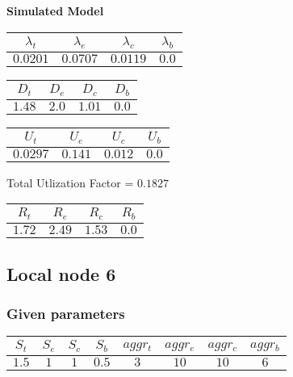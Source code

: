 \documentclass{article}
\begin{document}
\begin{minipage}{0.5\textwidth}
\centering	\textbf{Simulated Model}
\begin{table}[H]
\centering
\begin{tabular}{@{}cccc@{}}
\toprule
$\lambda_t$ & $\lambda_e$ & $\lambda_c$ & $\lambda_b$\\
\midrule
$0.0201$ & $0.0707$ & $0.0119$ & $0.0$\\
\bottomrule
\end{tabular}
\end{table}
\begin{table}[H]
\centering
\begin{tabular}{@{}cccc@{}}
\toprule
$D_t$ & $D_e$ & $D_c$ & $D_b$\\
\midrule
$1.48$ & $2.0$ & $1.01$ & $0.0$\\
\bottomrule
\end{tabular}
\end{table}\begin{table}[H]
\centering
\begin{tabular}{@{}cccc@{}}
\toprule
$U_t$ & $U_e$ & $U_c$ & $U_b$\\
\midrule
$0.0297$ & $0.141$ & $0.012$ & $0.0$\\
\bottomrule
\end{tabular}
\end{table}
\centering Total Utlization Factor = $0.1827$
\begin{table}[H]
\centering
\begin{tabular}{@{}cccc@{}}
\toprule
$R_t$ & $R_e$ & $R_c$ & $R_b$\\
\midrule
$1.72$ & $2.49$ & $1.53$ & $0.0$\\
\bottomrule
\end{tabular}
\end{table}
\end{minipage}
\newpage\subsection{Local node 6}
\subsubsection{Given parameters}
\begin{table}[H]
\centering
\begin{tabular}{@{}cccc|cccc@{}}
\toprule
$S_t$ & $S_e$ & $S_c$ & $S_b$ & $aggr_t$ & $aggr_e$ & $aggr_c$ & $aggr_b$\\
\midrule
$1.5$ & $1$ & $1$ & $0.5$ & $3$ & $10$ & $10$ & $6$\\
\bottomrule
\end{tabular}
\end{table}
\end{document}
